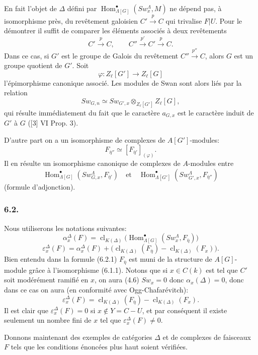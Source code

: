 \documentclass[11pt]{article}
\DeclareMathOperator{\Hom}{Hom}
\providecommand{\Hom}{\operatorname{Hom}}
\providecommand{\clK}[1]{\operatorname{cl}_{K(#1)}}
\providecommand{\Hom}{\operatorname{Hom}}
\begin{document}
En fait l'objet de $\Delta$ défini par $\Hom^\bullet_{\Lambda[G]}(Sw_x^\Lambda,M)$ ne dépend pas, à isomorphisme près, du revêtement galoisien $C'\xrightarrow{p}C$ qui trivalise $F|U$. Pour le démontrer il suffit de comparer les éléments associés à deux revêtements
\[
C'\xrightarrow{p}C,\qquad C''\xrightarrow{p'}C'\xrightarrow{p}C.
\]
Dans ce cas, si $G'$ est le groupe de Galois du revêtement $C''\xrightarrow{p''}C$, alors $G$ est un groupe quotient de $G'$. Soit
\[
\varphi:Z_\ell[G']\longrightarrow Z_\ell[G]
\]
l'épimorphisme canonique associé. Les modules de Swan sont alors liés par la relation
\[
Sw_{G,n}\simeq Sw_{G',x}\otimes_{Z_\ell[G']}Z_\ell[G],
\]
qui résulte immédiatement du
fait que le caractère $a_{G,x}$ est le caractère induit de $G'$ à $G$ ([3] VI Prop. 3).

D'autre part on a un isomorphisme de complexes de $A[G']$-modules:
\[
F_{\bar\eta''}\simeq [F_{\bar\eta'}]_{(\varphi)}.
\]
Il en résulte un isomorphisme canonique de complexes de $A$-modules entre
\[
\Hom^\bullet_{\Lambda[G]}(Sw_{G,x}^\Lambda,F_{\bar\eta'})
\quad\text{et}\quad
\Hom^\bullet_{\Lambda[G']}(Sw_{G',x}^\Lambda,F_{\bar\eta''})
\]
(formule d'adjonction).

\subsubsection*{6.2.}

Nous utiliserons les notations suivantes:
\[
\alpha_x^\Delta(F)
=
\clK{\Delta}\bigl(\Hom^\bullet_{\Lambda[G]}(Sw_x^\Lambda,F_{\bar\eta})\bigr)
\tag{6.2.1}
\]
\[
\varepsilon_x^\Delta(F)
=
\alpha_x^\Delta(F)+
\bigl(\clK{\Delta}(F_{\bar\eta})-\clK{\Delta}(F_x)\bigr).
\tag{6.2.2}
\]
Bien entendu dans la formule (6.2.1) $F_{\bar\eta}$ est muni de la structure de $A[G]$-module grâce à l'isomorphisme (6.1.1). Notons que si $x\in C(k)$ est tel que $C'$ soit modérément ramifié en $x$, on aura (4.6) $Sw_x=0$ donc $\alpha_x(\Delta)=0$, donc dans ce cas on aura (en conformité avec Ogg-Chafarévitch):
\[
\varepsilon_x^\Delta(F)=\clK{\Delta}(F_{\bar\eta})-\clK{\Delta}(F_x).
\tag{6.2.3}
\]
Il est clair que $\varepsilon_x^\Delta(F)=0$ si $x\notin Y=C-U$, et par conséquent il existe seulement un nombre fini de $x$ tel que $\varepsilon_x^\Delta(F)\ne0$.

Donnons maintenant des exemples de catégories $\Delta$ et de complexes de faisceaux $F$ tels que les conditions énoncées plus haut soient vérifiées.
\end{document}
